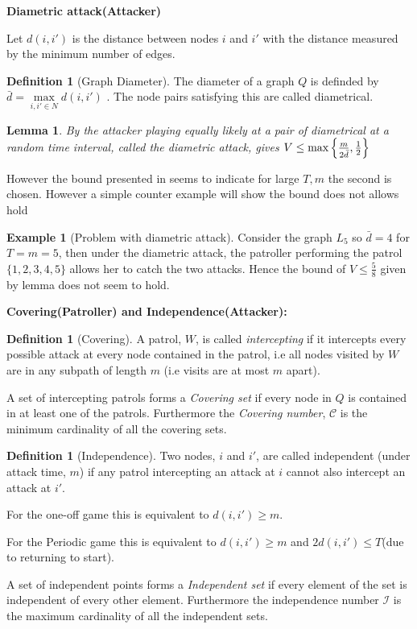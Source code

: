 \documentclass[a4paper,10pt]{article}
\newtheorem{lemma}[theorem]{Lemma}
\theoremstyle{definition}
\newtheorem{definition}[theorem]{Definition}
\theoremstyle{definition}
\newtheorem{example}[theorem]{Example}
\theoremstyle{remark}
\theoremstyle{definition}
\begin{document}
\textbf{Diametric attack(Attacker)}

Let $d(i,i')$ is the distance between nodes $i$ and $i'$ with the distance measured by the minimum number of edges.

\begin{definition}[Graph Diameter]
The diameter of a graph $Q$ is definded by $\bar{d}=\max\limits_{i,i' \in N} d(i,i')$ . The node pairs satisfying this are called diametrical.
\end{definition}

\begin{lemma}
By the attacker playing equally likely at a pair of diametrical at a random time interval, called the diametric attack, gives $V \leq \max\left\{\frac{m}{\raisebox{-0.5ex}{$\scriptstyle 2 \bar{d}$}} , \frac{1}{2} \right\}$
\end{lemma}

However the bound presented in \citep{Alpern2011} seems to indicate for large $T,m$ the second is chosen. However a simple counter example will show the bound does not allows hold
\begin{example}[Problem with diametric attack]
\label{example:counterexamplediamater} 
Consider the graph $L_{5}$ so $\bar{d}=4$ for $T=m=5$, then under the diametric attack, the patroller performing the patrol $\{ 1,2,3,4,5 \}$ allows her to catch the two attacks. Hence the bound of $V \leq \frac{5}{8}$ given by lemma does not seem to hold. 
\end{example}



\textbf{Covering(Patroller) and Independence(Attacker):}

\begin{definition}[Covering]
A patrol, $W$, is called \textit{intercepting} if it intercepts every possible attack at every node contained in the patrol, i.e all nodes visited by $W$ are in any subpath of length $m$ (i.e visits are at most $m$ apart).

A set of intercepting patrols forms a \textit{Covering set} if every node in $Q$ is contained in at least one of the patrols. Furthermore the \textit{Covering number}, $\mathcal{C}$ is the minimum cardinality of all the covering sets.
\end{definition}

\begin{definition}[Independence]
Two nodes, $i$ and $i'$, are called independent (under attack time, $m$) if any patrol intercepting an attack at $i$ cannot also intercept an attack at $i'$.

For the one-off game this is equivalent to $d(i,i') \geq m$.

For the Periodic game this is equivalent to $d(i,i') \geq m$ and $2d(i,i') \leq T$(due to returning to start).

A set of independent points forms a \textit{Independent set} if every element of the set is independent of every other element. Furthermore the independence number $\mathcal{I}$ is the maximum cardinality of all the independent sets.
\end{definition}
\end{document}
